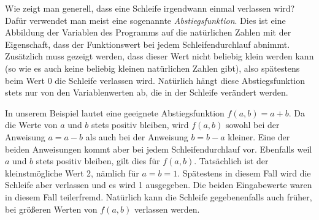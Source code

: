 \vspace{1.7mm} %

Wie zeigt man generell, dass eine Schleife irgendwann einmal verlassen wird? Dafür verwendet man meist eine sogenannte \emph{Abstiegsfunktion}. 
Dies ist eine Abbildung der Variablen des Programms auf die natürlichen Zahlen mit der Eigenschaft, dass der Funktionswert bei jedem Schleifendurchlauf abnimmt. Zusätzlich muss gezeigt werden, dass dieser Wert nicht beliebig klein werden kann (so wie es auch keine beliebig kleinen natürlichen Zahlen gibt), also spätestens beim Wert 0 die Schleife verlassen wird. Natürlich hängt diese Abstiegsfunktion stets nur von den Variablenwerten ab, die in der Schleife verändert werden.

\vspace{1.7mm} %

In unserem Beispiel lautet eine geeignete Abstiegsfunktion $f(a,b) = a+b$. Da die Werte von $a$ und $b$ stets positiv bleiben, wird $f(a,b)$ sowohl bei der Anweisung $a = a-b$ als auch bei der Anweisung $b = b-a$ kleiner. Eine der beiden Anweisungen kommt aber bei jedem Schleifendurchlauf vor. Ebenfalls weil $a$ und $b$ stets positiv bleiben, gilt dies für $f(a,b)$. Tatsächlich ist der kleinstmögliche Wert 2, nämlich für $a = b = 1$. Spätestens in diesem Fall wird die Schleife aber verlassen und es wird 1 ausgegeben. Die beiden Eingabewerte waren in diesem Fall teilerfremd. Natürlich kann die Schleife gegebenenfalls auch früher, \dasHeisst bei größeren Werten von $f(a,b)$ verlassen werden.